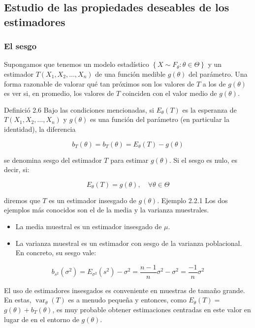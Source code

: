 \documentclass[
]{article}
\providecommand{\tightlist}{%
  \setlength{\itemsep}{0pt}\setlength{\parskip}{0pt}}
\begin{document}
\subsection{Estudio de las propiedades deseables de los estimadores}\label{estudio-de-las-propiedades-deseables-de-los-estimadores}

\subsubsection{El sesgo}\label{el-sesgo}

Supongamos que tenemos un modelo estadístico \(\left\{X \sim F_{\theta}: \theta \in \Theta\right\}\) y un estimador \(T\left(X_{1}, X_{2}, \ldots, X_{n}\right)\) de una función medible \(g(\theta)\) del parámetro. Una forma razonable de valorar qué tan próximos son los valores de \(T\) a los de \(g(\theta)\) es ver si, en promedio, los valores de \(T\) coinciden con el valor medio de \(g(\theta)\).

Definició 2.6 Bajo las condiciones mencionadas, si \(E_{\theta}(T)\) es la esperanza de \(T\left(X_{1}, X_{2}, \ldots, X_{n}\right)\) y \(g(\theta)\) es una función del parámetro (en particular la identidad), la diferencia

\[
b_{T}(\theta)=b_{T}(\theta)=E_{\theta}(T)-g(\theta)
\]

se denomina sesgo del estimador \(T\) para estimar \(g(\theta)\). Si el sesgo es nulo, es decir, si:

\[
E_{\theta}(T)=g(\theta), \quad \forall \theta \in \Theta
\]

diremos que \(T\) es un estimador insesgado de \(g(\theta)\).
Ejemplo 2.2.1 Los dos ejemplos más conocidos son el de la media y la varianza muestrales.

\begin{itemize}
\tightlist
\item
  La media muestral es un estimador insesgado de \(\mu\).
\item
  La varianza muestral es un estimador con sesgo de la varianza poblacional. En concreto, su sesgo vale:
\end{itemize}

\[
b_{s^{2}}\left(\sigma^{2}\right)=E_{\sigma^{2}}\left(s^{2}\right)-\sigma^{2}=\frac{n-1}{n} \sigma^{2}-\sigma^{2}=\frac{-1}{n} \sigma^{2}
\]

El uso de estimadores insesgados es conveniente en muestras de tamaño grande. En estas, \(\operatorname{var}_{\theta}(T)\) es a menudo pequeña y entonces, como \(E_{\theta}(T)=\) \(g(\theta)+b_{T}(\theta)\), es muy probable obtener estimaciones centradas en este valor en lugar de en el entorno de \(g(\theta)\).
\end{document}
